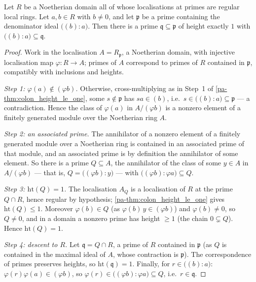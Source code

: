 \begin{theorem}
  \label{pa-thm:pole_prime_height_one}
  \leanok

  Let \(R\) be a Noetherian domain all of whose localisations at primes are
  regular local rings. Let \(a, b \in R\) with \(b \neq 0\), and let
  \(\mathfrak p\) be a prime containing the denominator ideal
  \(\bigl((b) : a\bigr)\). Then there is a prime
  \(\mathfrak q \subseteq \mathfrak p\) of height exactly \(1\) with
  \(\bigl((b) : a\bigr) \subseteq \mathfrak q\).
\end{theorem}
\begin{proof}
  \leanok
  Work in the localisation \(A = R_{\mathfrak p}\), a Noetherian domain, with
  injective localisation map \(\varphi : R \to A\); primes of \(A\) correspond
  to primes of \(R\) contained in \(\mathfrak p\), compatibly with inclusions
  and heights.

  \emph{Step 1: \(\varphi(a) \notin (\varphi b)\).} Otherwise, cross-multiplying
  as in Step~1 of \ref{pa-thm:colon_height_le_one}, some \(s \notin \mathfrak p\)
  has \(s a \in (b)\), i.e.\ \(s \in \bigl((b) : a\bigr) \subseteq \mathfrak p\)
  --- a contradiction. Hence the class of \(\varphi(a)\) in \(A/(\varphi b)\) is
  a nonzero element of a finitely generated module over the Noetherian ring
  \(A\).

  \emph{Step 2: an associated prime.} The annihilator of a nonzero element of a
  finitely generated module over a Noetherian ring is contained in an associated
  prime of that module, and an associated prime is by definition the annihilator
  of some element. So there is a prime \(Q \subseteq A\), the annihilator of the
  class of some \(y \in A\) in \(A/(\varphi b)\) --- that is,
  \(Q = \bigl((\varphi b) : y\bigr)\) --- with
  \(\bigl((\varphi b) : \varphi a\bigr) \subseteq Q\).

  \emph{Step 3: \(\mathrm{ht}(Q) = 1\).} The localisation \(A_Q\) is a
  localisation of \(R\) at the prime \(Q \cap R\), hence regular by hypothesis;
  \ref{pa-thm:colon_height_le_one} gives \(\mathrm{ht}(Q) \leq 1\). Moreover
  \(\varphi(b) \in Q\) (as \(\varphi(b)\, y \in (\varphi b)\)) and
  \(\varphi(b) \neq 0\), so \(Q \neq 0\), and in a domain a nonzero prime has
  height \(\geq 1\) (the chain \(0 \subsetneq Q\)). Hence
  \(\mathrm{ht}(Q) = 1\).

  \emph{Step 4: descent to \(R\).} Let \(\mathfrak q = Q \cap R\), a prime of
  \(R\) contained in \(\mathfrak p\) (as \(Q\) is contained in the maximal ideal
  of \(A\), whose contraction is \(\mathfrak p\)). The correspondence of primes
  preserves heights, so \(\mathrm{ht}(\mathfrak q) = 1\). Finally, for
  \(r \in \bigl((b) : a\bigr)\): \(\varphi(r)\varphi(a) \in (\varphi b)\), so
  \(\varphi(r) \in \bigl((\varphi b) : \varphi a\bigr) \subseteq Q\), i.e.\
  \(r \in \mathfrak q\).
\end{proof}

